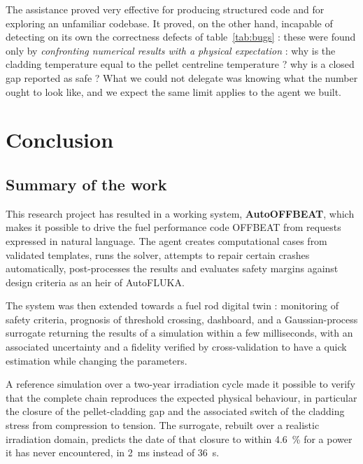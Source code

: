 \documentclass[12pt,a4paper]{report}
\begin{document}
The assistance proved very effective for producing structured code and for
exploring an unfamiliar codebase. It proved, on the other hand, incapable of
detecting on its own the correctness defects of table~\ref{tab:bugs} : these were
found only by \emph{confronting numerical results with a physical expectation} : why is the cladding temperature equal to the pellet centreline temperature ? why
is a closed gap reported as safe ? What we could not delegate was
knowing what the number ought to look like, and we expect the same limit applies
to the agent we built.

\clearpage
\chapter*{Conclusion}

\section*{Summary of the work}

This research project has resulted in a working system, \textbf{AutoOFFBEAT},
which makes it possible to drive the fuel performance code OFFBEAT from requests
expressed in natural language. The agent creates computational cases from
validated templates, runs the solver, attempts to repair certain crashes
automatically, post-processes the results and evaluates safety margins against
design criteria as an heir of AutoFLUKA.

The system was then extended towards a fuel rod digital twin : monitoring of
safety criteria, prognosis of threshold crossing, dashboard, and a
Gaussian-process surrogate returning the results of a simulation within a few
milliseconds, with an associated uncertainty and a fidelity verified by
cross-validation to have a quick estimation while changing the parameters.

A reference simulation over a two-year irradiation cycle made it possible to
verify that the complete chain reproduces the expected physical behaviour, in
particular the closure of the pellet-cladding gap and the associated switch of
the cladding stress from compression to tension. The surrogate, rebuilt over a
realistic irradiation domain, predicts the date of that closure to within
\SI{4.6}{\percent} for a power it has never encountered, in \SI{2}{\milli\second}
instead of \SI{36}{\second}.
\end{document}
